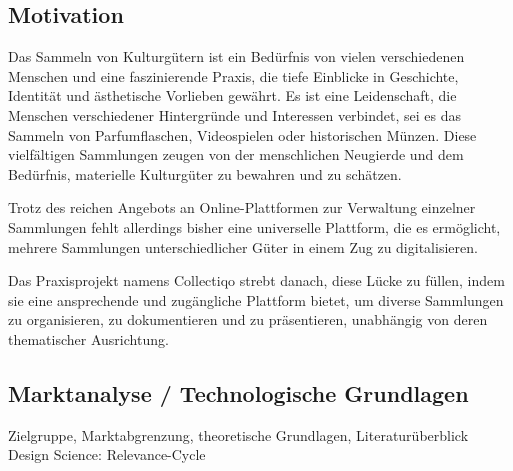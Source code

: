 \subsection{Motivation}\label{subsec:Motivation}

Das Sammeln von Kulturgütern ist ein Bedürfnis von vielen verschiedenen Menschen und eine faszinierende Praxis, die tiefe Einblicke in Geschichte, Identität und ästhetische Vorlieben gewährt.
Es ist eine Leidenschaft, die Menschen verschiedener Hintergründe und Interessen verbindet, sei es das Sammeln von Parfumflaschen, Videospielen oder historischen Münzen.
Diese vielfältigen Sammlungen zeugen von der menschlichen Neugierde und dem Bedürfnis, materielle Kulturgüter zu bewahren und zu schätzen. \par
Trotz des reichen Angebots an Online-Plattformen zur Verwaltung einzelner Sammlungen fehlt allerdings bisher eine universelle Plattform, die es ermöglicht, mehrere Sammlungen unterschiedlicher Güter in einem Zug zu digitalisieren. \par
Das Praxisprojekt namens Collectiqo strebt danach, diese Lücke zu füllen, indem sie eine ansprechende und zugängliche Plattform bietet, um diverse Sammlungen zu organisieren, zu dokumentieren und zu präsentieren, unabhängig von deren thematischer Ausrichtung.

\subsection{Marktanalyse / Technologische Grundlagen}\label{subsec:Marktanalyse-TechnologischeGrundlagen}
Zielgruppe, Marktabgrenzung, theoretische Grundlagen, Literaturüberblick\linebreak
Design Science: Relevance-Cycle